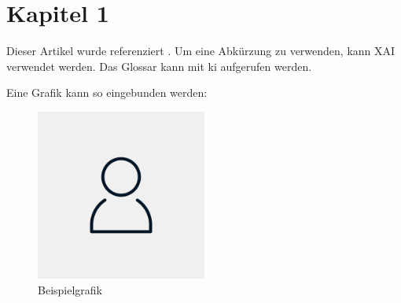 \section{Kapitel 1}

Dieser Artikel wurde referenziert \cite{bauer_explained_2023}. Um eine Abkürzung zu verwenden, kann \ac{XAI} verwendet werden. Das Glossar kann mit \gls{ki} aufgerufen werden.

Eine Grafik kann so eingebunden werden:
\begin{figure}[H]
    \centering
    \includegraphics[width=0.5\textwidth]{assets/placehoder.png}
    \caption{Beispielgrafik}
    \label{fig:example}
\end{figure}

\lipsum[1-2]